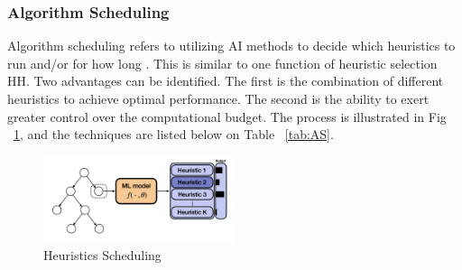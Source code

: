 \documentclass[a4paper]{article}
\begin{document}
\begin{table}[h]
\centering
\caption{Methods on algorithm selection \& generation}\label{tab:AS}
\end{table}

\subsubsection{Algorithm Scheduling}
Algorithm scheduling refers to utilizing AI methods to decide which heuristics to run and/or for how long \citep{Scavuzzo}. This is similar to one function of heuristic selection HH. Two advantages can be identified. The first is the combination of different heuristics to achieve optimal performance. The second is the ability to exert greater control over the computational budget. The process is illustrated in Fig ~\ref{fig:HS}, and the techniques are listed below on Table ~\ref{tab:AS}.

\begin{figure}[h]
\centering
\includegraphics[width=0.5\textwidth]{figures/Heuristics Scheduling.png}
    \caption{\label{fig:HS}Heuristics Scheduling}
\end{figure}
\end{document}

